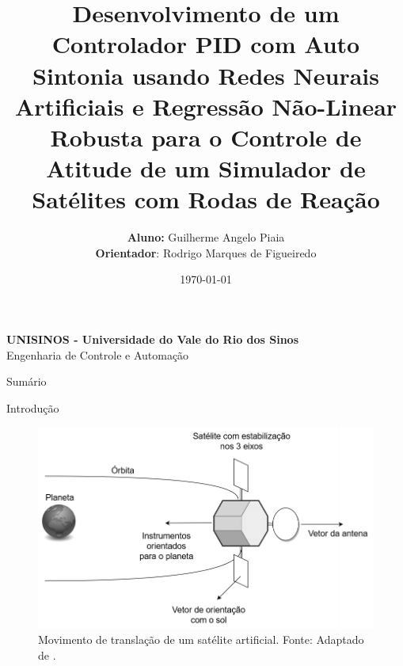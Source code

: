 \documentclass{beamer}
\title[ Desenvolvimento de um Controlador PID com Auto Sintonia usando Redes Neurais Artificiais e Regressão ...]{Desenvolvimento de um Controlador PID com Auto Sintonia usando Redes Neurais Artificiais e Regressão Não-Linear Robusta para o Controle de Atitude de um Simulador de Satélites com
Rodas de Reação}
\author[Piaia, G. A.]{
	{\fontsize{10}{8}\selectfont \textbf{Aluno:} Guilherme Angelo Piaia} \\
	{\fontsize{10}{8}\selectfont \textbf{Orientador}: Rodrigo Marques de Figueiredo}
}
\date{\today}
\begin{document}

\begin{frame}
	\begin{minipage}{1\linewidth}
		\centering
		    \textbf{UNISINOS - Universidade do Vale do Rio dos Sinos} \\ Engenharia de Controle e Automação
	\end{minipage}
	\titlepage
\end{frame}


\begin{frame}{Sumário}
	\tableofcontents
\end{frame}


\begin{frame}{Introdução}
    \begin{figure}[HT]
		\begin{center}
		\captionsetup{justification=centering}
        \includegraphics[scale=.42]{../referencial/img/rotational_brown_p256}
        \caption{Movimento de translação de um satélite artificial. \newline
        		 Fonte: Adaptado de .}
		\label{FIG_ADAPTATIVO}
        \end{center}
	\end{figure}
\end{frame}

\end{document}
